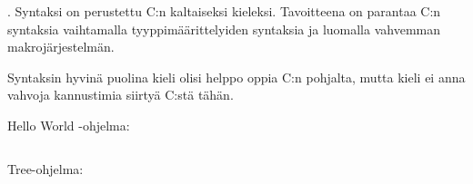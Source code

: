 
\bnfdescription.
Syntaksi on perustettu C:n kaltaiseksi kieleksi. Tavoitteena on parantaa C:n
syntaksia vaihtamalla tyyppimäärittelyiden syntaksia ja luomalla vahvemman
makrojärjestelmän.

Syntaksin hyvinä puolina kieli olisi helppo oppia C:n pohjalta, mutta kieli ei anna
vahvoja kannustimia siirtyä C:stä tähän.


\newpage


\newpage

Hello World -ohjelma:

\inputminted{C}{hello.curly}

Tree-ohjelma:

\inputminted{C}{tree.curly}
